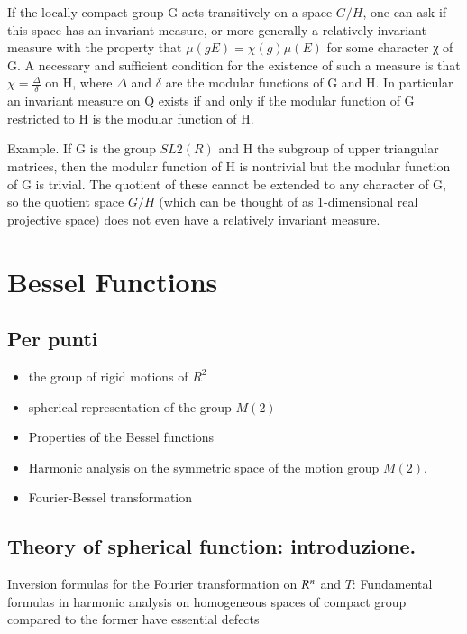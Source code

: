 \documentclass[oneside,12pt]{memoir}
\begin{document}
If the locally compact group G acts transitively on a space $G/H$, one can ask if this space has an invariant measure, or more generally a relatively invariant measure with the property that $\mu(gE)=\chi(g)\mu(E)$ for some character χ of G. A necessary and sufficient condition for the existence of such a measure is that $\chi=\frac{\Delta}{\delta}$ on H, where $\Delta$ and $\delta$ are the modular functions of G and H. In particular an invariant measure on Q exists if and only if the modular function of G restricted to H is the modular function of H.

Example. If G is the group $SL2(R)$ and H the subgroup of upper triangular matrices, then the modular function of H is nontrivial but the modular function of G is trivial. The quotient of these cannot be extended to any character of G, so the quotient space $G/H$ (which can be thought of as 1-dimensional real projective space) does not even have a relatively invariant measure.


\chapter{Bessel Functions}
\PartialToc

\section{Per punti}

\begin{itemize}
\item the group of rigid motions of $R^2$
\item spherical representation of the group $M(2)$
\item Properties of the Bessel functions
\item Harmonic analysis on the symmetric space of the motion group $M(2)$.
\item Fourier-Bessel transformation
\end{itemize}

\section{Theory of spherical function: introduzione.}

Inversion formulas for the Fourier transformation on $R^{n}$ and $T$: Fundamental formulas in harmonic analysis on homogeneous spaces of compact group compared to the former have essential defects
\end{document}
